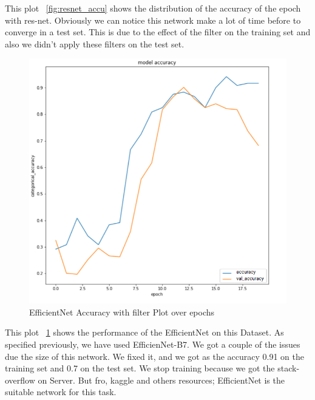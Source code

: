 \documentclass[a4paper]{article}
\begin{document}
This plot ~\ref{fig:resnet_accu} shows the distribution of the accuracy of the epoch with res-net. Obviously we can notice this network make a lot of time before to converge in a test set. This is due to the effect of the filter on the training set and also we didn't apply these filters on the test set. 


 \begin{figure}[H]
    \includegraphics[width=\linewidth]{images/new_eff.png}
            \caption{EfficientNet Accuracy with filter Plot over epochs}
    \label{fig:effiaccu}
 \end{figure}
 This plot ~\ref{fig:effiaccu} shows the performance of the EfficientNet on this Dataset. As specified previously, we have used EfficienNet-B7. We got a couple of the issues due the size of this network. We fixed it, and we got as the accuracy 0.91 on the training set and 0.7 on the test set. We stop training because we got the stack-overflow on Server.
 But fro, kaggle and others resources; EfficientNet is the suitable network for this task.
\end{document}
